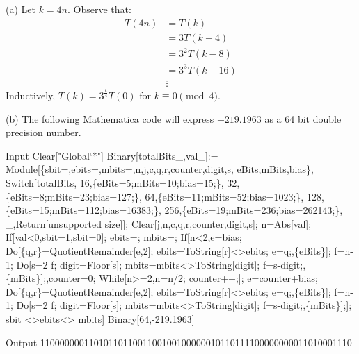\documentclass[10pt,twoside,openany]{memoir}
\begin{document}
        \begin{mdframed}
        \begin{solution}
            (a) Let $k  = 4n$. Observe that:
                \begin{equation*}
                \begin{split}
                    T(4n)
                    & = T(k) \\
                    & = 3T(k-4) \\
                    & = 3^2 T(k-8) \\
                    & = 3^3 T(k-16) \\
                    &\vdots
                \end{split}
                \end{equation*} 
            Inductively, $T(k) = 3^\frac{k}{4}T(0)$ for $k \equiv 0 \pmod{4}$. \nl
            
            \noindent (b) The following Mathematica code will express $-219.1963$ as a 64 bit double precision number.
            \begin{mmaCell}[addtoindex=-1,moredefined={Binary, e, f, \
                CellToTeX},morepattern={totalBits_, val_, totalBits, val, \
                cell},morelocal={sbit, ebits,
                mbits, n, j, c, q, r, counter, digit, s, eBits, mBits, bias}]{Input}
Clear["Global`*"]
Binary[totalBits_,val_]:=
  Module[\{sbit=,ebits=,mbits=,n,j,c,q,r,counter,digit,s,
    eBits,mBits,bias\},
   Switch[totalBits,
    16,\{eBits=5;mBits=10;bias=15;\},
    32,\{eBits=8;mBits=23;bias=127;\},
    64,\{eBits=11;mBits=52;bias=1023;\},
    128,\{eBits=15;mBits=112;bias=16383;\},
    256,\{eBits=19;mBits=236;bias=262143;\},
    _,Return[unsupported size]];
  Clear[j,n,c,q,r,counter,digit,s];
  n=Abs[val];
  If[val<0,sbit=1,sbit=0];
  ebits=;
  mbits=;
  If[n<2,e=bias;
    Do[\{q,r\}=QuotientRemainder[e,2];
     ebits=ToString[r]<>ebits;
     e=q;,\{eBits\}];
    f=n-1;
    Do[s=2 f;
     digit=Floor[s];
     mbits=mbits<>ToString[digit];
     f=s-digit;,\{mBits\}];,counter=0;
    While[n>=2,n=n/2;
     counter++;];
    e=counter+bias;
    Do[\{q,r\}=QuotientRemainder[e,2];
     ebits=ToString[r]<>ebits;
     e=q;,\{eBits\}];
    f=n-1;
    Do[s=2 f;
     digit=Floor[s];
     mbits=mbits<>ToString[digit];
     f=s-digit;,\{mBits\}];];
    sbit <>ebits<> mbits]
Binary[64,-219.1963]
\end{mmaCell}
\begin{mmaCell}[addtoindex=2]{Output}
1100000001101011011001100100100000010110111100000000011010001110
\end{mmaCell}


\end{solution}
\end{mdframed}
\end{document}
